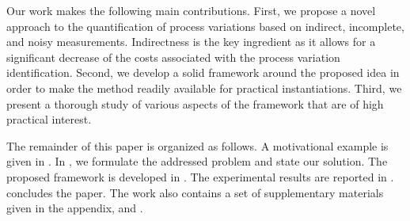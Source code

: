 Our work makes the following main contributions. First, we propose a novel approach to the quantification of process variations based on indirect, incomplete, and noisy measurements. Indirectness is the key ingredient as it allows for a significant decrease of the costs associated with the process variation identification. Second, we develop a solid framework around the proposed idea in order to make the method readily available for practical instantiations. Third, we present a thorough study of various aspects of the framework that are of high practical interest.

The remainder of this paper is organized as follows. A motivational example is given in . In , we formulate the addressed problem and state our solution. The proposed framework is developed in . The experimental results are reported in .  concludes the paper. The work also contains a set of supplementary materials given in the appendix,  and .
